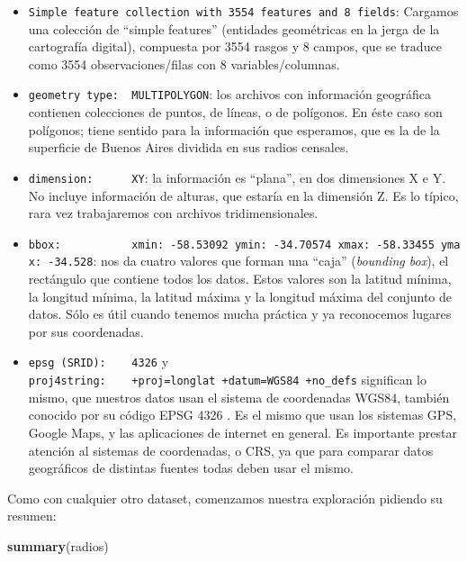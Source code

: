 \documentclass[]{book}
\newenvironment{Shaded}{\begin{snugshade}}{\end{snugshade}}
\newcommand{\KeywordTok}[1]{\textcolor[rgb]{0.13,0.29,0.53}{\textbf{#1}}}
\newcommand{\NormalTok}[1]{#1}
\providecommand{\tightlist}{%
  \setlength{\itemsep}{0pt}\setlength{\parskip}{0pt}}
\begin{document}
\begin{itemize}
\tightlist
\item
  \texttt{Simple\ feature\ collection\ with\ 3554\ features\ and\ 8\ fields}:
  Cargamos una colección de ``simple features'' (entidades geométricas
  en la jerga de la cartografía digital), compuesta por 3554 rasgos y 8
  campos, que se traduce como 3554 observaciones/filas con 8
  variables/columnas.
\item
  \texttt{geometry\ type:\ \ MULTIPOLYGON}: los archivos con información
  geográfica contienen colecciones de puntos, de líneas, o de polígonos.
  En éste caso son polígonos; tiene sentido para la información que
  esperamos, que es la de la superficie de Buenos Aires dividida en sus
  radios censales.
\item
  \texttt{dimension:\ \ \ \ \ \ XY}: la información es ``plana'', en dos
  dimensiones X e Y. No incluye información de alturas, que estaría en
  la dimensión Z. Es lo típico, rara vez trabajaremos con archivos
  tridimensionales.
\item
  \texttt{bbox:\ \ \ \ \ \ \ \ \ \ \ xmin:\ -58.53092\ ymin:\ -34.70574\ xmax:\ -58.33455\ ymax:\ -34.528}:
  nos da cuatro valores que forman una ``caja'' (\emph{bounding box}),
  el rectángulo que contiene todos los datos. Estos valores son la
  latitud mínima, la longitud mínima, la latitud máxima y la longitud
  máxima del conjunto de datos. Sólo es útil cuando tenemos mucha
  práctica y ya reconocemos lugares por sus coordenadas.
\item
  \texttt{epsg\ (SRID):\ \ \ \ 4326} y
  \texttt{proj4string:\ \ \ \ +proj=longlat\ +datum=WGS84\ +no\_defs}
  significan lo mismo, que nuestros datos usan el sistema de coordenadas
  WGS84, también conocido por su código EPSG 4326 . Es el mismo que usan
  los sistemas GPS, Google Maps, y las aplicaciones de internet en
  general. Es importante prestar atención al sistemas de coordenadas, o
  CRS, ya que para comparar datos geográficos de distintas fuentes todas
  deben usar el mismo.
\end{itemize}

Como con cualquier otro dataset, comenzamos nuestra exploración pidiendo
su resumen:

\begin{Shaded}
\begin{Highlighting}[]
\KeywordTok{summary}\NormalTok{(radios)}
\end{Highlighting}
\end{Shaded}
\end{document}
